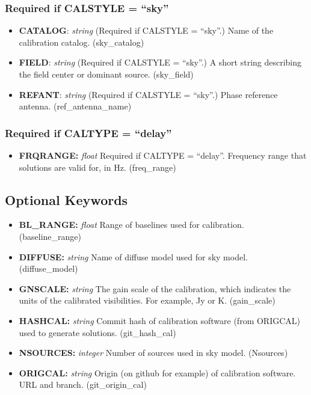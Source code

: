 \documentclass[11pt, oneside, english]{article}   	%
\begin{document}
	\subsubsection{Required if CALSTYLE = ``sky''}
	\begin{itemize}
	\item{\textbf{CATALOG}: \emph{string} (Required if CALSTYLE = ``sky''.) Name of the calibration catalog. (sky\_catalog)}
	\item{\textbf{FIELD}: \emph{string} (Required if CALSTYLE = ``sky''.) A short string describing the field center or dominant source. (sky\_field)}
	\item{\textbf{REFANT}: \emph{string} (Required if CALSTYLE = ``sky''.) Phase reference antenna. (ref\_antenna\_name)}
	\end{itemize}
	
	
	\subsubsection{Required if CALTYPE = ``delay''}
	\begin{itemize}
	\item{\textbf{FRQRANGE:} \emph{float} Required if CALTYPE = ``delay''. Frequency range that solutions are valid for, in Hz. (freq\_range)}
	\end{itemize}
	
	
\subsection{Optional Keywords}
\begin{itemize}
\item{\textbf{BL\_RANGE:} \emph{float} Range of baselines used for calibration. (baseline\_range)}
\item{\textbf{DIFFUSE:} \emph{string} Name of diffuse model used for sky model. (diffuse\_model)}
\item{\textbf{GNSCALE:} \emph{string} The gain scale of the calibration, which indicates the units of the calibrated visibilities. For example, Jy or K. (gain\_scale)}
\item{\textbf{HASHCAL:} \emph{string} Commit hash of calibration software (from ORIGCAL) used to generate solutions. (git\_hash\_cal)}
\item{\textbf{NSOURCES:} \emph{integer} Number of sources used in sky model. (Nsources)}
\item{\textbf{ORIGCAL:} \emph{string} Origin (on github for example) of calibration software. URL and branch. (git\_origin\_cal)}
\end{itemize}
\end{document}
